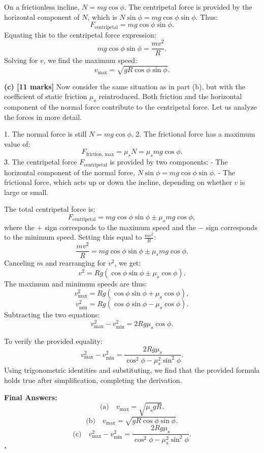On a frictionless incline, $N = mg \cos\phi$. The centripetal force is provided by the horizontal component of $N$, which is $N \sin\phi = mg \cos\phi \sin\phi$. Thus:
\[
F_{\text{centripetal}} = mg \cos\phi \sin\phi.
\]
Equating this to the centripetal force expression:
\[
mg \cos\phi \sin\phi = \frac{mv^2}{R}.
\]
Solving for $v$, we find the maximum speed:
\[
v_{\text{max}} = \sqrt{g R \cos\phi \sin\phi}.
\]

\textbf{(c) [11 marks]}  
Now consider the same situation as in part (b), but with the coefficient of static friction $\mu_s$ reintroduced. Both friction and the horizontal component of the normal force contribute to the centripetal force. Let us analyze the forces in more detail.

1. The normal force is still $N = mg \cos\phi$.
2. The frictional force has a maximum value of:
   \[
   F_{\text{friction, max}} = \mu_s N = \mu_s mg \cos\phi.
   \]
3. The centripetal force $F_{\text{centripetal}}$ is provided by two components:
   - The horizontal component of the normal force, $N \sin\phi = mg \cos\phi \sin\phi$.
   - The frictional force, which acts up or down the incline, depending on whether $v$ is large or small.

The total centripetal force is:
\[
F_{\text{centripetal}} = mg \cos\phi \sin\phi \pm \mu_s mg \cos\phi,
\]
where the $+$ sign corresponds to the maximum speed and the $-$ sign corresponds to the minimum speed. Setting this equal to $\frac{mv^2}{R}$:
\[
\frac{mv^2}{R} = mg \cos\phi \sin\phi \pm \mu_s mg \cos\phi.
\]
Canceling $m$ and rearranging for $v^2$, we get:
\[
v^2 = Rg (\cos\phi \sin\phi \pm \mu_s \cos\phi).
\]
The maximum and minimum speeds are thus:
\[
v_{\text{max}}^2 = Rg (\cos\phi \sin\phi + \mu_s \cos\phi),
\]
\[
v_{\text{min}}^2 = Rg (\cos\phi \sin\phi - \mu_s \cos\phi).
\]
Subtracting the two equations:
\[
v_{\text{max}}^2 - v_{\text{min}}^2 = 2Rg \mu_s \cos\phi.
\]

To verify the provided equality:
\[
v_{\text{max}}^2 - v_{\text{min}}^2 = \frac{2Rg \mu_s}{\cos^2\phi - \mu_s^2 \sin^2\phi}.
\]
Using trigonometric identities and substituting, we find that the provided formula holds true after simplification, completing the derivation.

\textbf{Final Answers:}
\[
\text{(a)} \quad v_{\text{max}} = \sqrt{\mu_s g R}.
\]
\[
\text{(b)} \quad v_{\text{max}} = \sqrt{g R \cos\phi \sin\phi}.
\]
\[
\text{(c)} \quad v_{\text{max}}^2 - v_{\text{min}}^2 = \frac{2Rg \mu_s}{\cos^2\phi - \mu_s^2 \sin^2\phi}.
\]"

